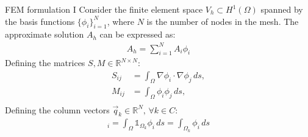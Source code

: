 \documentclass[aspectratio=54,xcolor=dvipsnames]{beamer}
\begin{document}
\begin{frame}{FEM formulation I}
    Consider the finite element space $V_h \subset H^1(\Omega)$ spanned by the basis functions $\{\phi_i\}_{i=1}^{N}$, where $N$ is the number of nodes in the mesh. The approximate solution $A_h$ can be expressed as:
    \begin{align*}
        A_h = \sum_{i=1}^{N} A_i \phi_i
    \end{align*}
    Defining the matrices $S, M \in \mathbb{R}^{N \times N}$:
    \begin{align*}
        S_{ij} &= \int_{\Omega} \nabla \phi_i \cdot \nabla \phi_j \, ds, \\
        M_{ij} &= \int_{\Omega} \phi_i \phi_j \, ds, \\
    \end{align*}
    Defining the column vectors $\vec{q}_k \in \mathbb{R}^N, \, \forall k \in C $:
    \begin{align*}
        [\vec{q}_k]_i = \int_{\Omega} \mathds{1}_{\Omega_k} \phi_i \, ds = \int_{\Omega_k} \phi_i \, ds
    \end{align*}

\end{frame}
\end{document}
